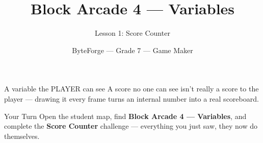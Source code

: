 \documentclass[aspectratio=169]{beamer}
\title{Block Arcade 4 — Variables}
\subtitle{Lesson 1: Score Counter}
\author{ByteForge --- Grade 7 --- Game Maker}
\date{}
\begin{document}
\begin{frame}
    \titlepage
\end{frame}

\begin{frame}{A variable the PLAYER can see}
    \Large
    A score no one can see isn't really a score to the player — drawing it every frame turns an internal number into a real scoreboard.
\end{frame}

\begin{frame}{Your Turn}
    \Large
    Open the student map, find \textbf{Block Arcade 4 — Variables}, and complete
    the \textbf{Score Counter} challenge --- everything you just saw, they now do themselves.
\end{frame}
\end{document}
